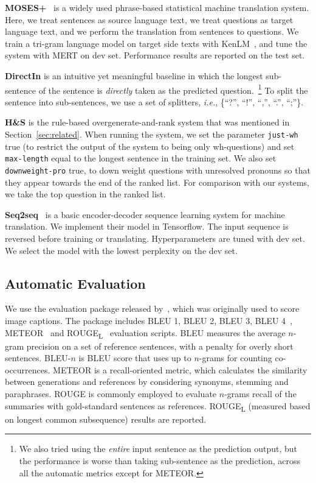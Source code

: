 \documentclass[11pt,a4paper]{article}
\newcommand{\ie}{{\em i.e.}}
\begin{document}
\vspace{0.1cm} \noindent \textbf{MOSES+}~\cite{koehn2007moses} is a widely used phrase-based statistical machine translation system. Here, we treat sentences as source language text, we treat questions as target language text, and we perform the translation from sentences to questions. We train a tri-gram language model on target side texts with KenLM~\cite{KenLM2015}, and tune the system with MERT on dev set. Performance results are reported on the test set.


\vspace{0.1cm} \noindent \textbf{DirectIn} is an intuitive yet meaningful baseline in which the longest sub-sentence of the sentence is \emph{directly} taken as the predicted question.~\footnote{We also tried using the \emph{entire} input sentence as the prediction output, but the performance is worse than taking sub-sentence as the prediction, across all the automatic metrics except for METEOR.} To split the sentence into sub-sentences, we use a set of splitters, \ie, \{``?'', ``!'', ``,'', ``.'', ``;''\}.

\vspace{0.1cm} \noindent \textbf{H\&S} is the rule-based overgenerate-and-rank system that was mentioned in Section~\ref{sec:related}. When running the system, we set the parameter \verb|just-wh| true (to restrict the output of the system to being only wh-questions) and set \verb|max-length| equal to the longest sentence in the training set. We also set \verb|downweight-pro| true, to down weight questions with unresolved pronouns so that they appear towards the end of the ranked list. For comparison with our systems, we take the top question in the ranked list.

\vspace{0.1cm} \noindent \textbf{Seq2seq}~\cite{sutskever2014sequence} is a basic encoder-decoder sequence learning system for machine translation. We implement their model in Tensorflow. The input sequence is reversed before training or translating. Hyperparameters are tuned with dev set. We select the model with the lowest perplexity on the dev set.


\subsection{Automatic Evaluation} 

We use the evaluation package released by~, which was originally used to score image captions. The package includes BLEU 1, BLEU 2, BLEU 3, BLEU 4~\cite{papineni2002bleu}, METEOR~\cite{2014meteor} and ROUGE\textsubscript{L}~\cite{lin2004rouge} evaluation scripts. BLEU measures the average $n$-gram precision on a set of reference sentences, with a penalty for overly short sentences. BLEU-$n$ is BLEU score that uses up to $n$-grams for counting co-occurrences. METEOR is a recall-oriented metric, which calculates the similarity between generations and references by considering synonyms, stemming and paraphrases. ROUGE is commonly employed to evaluate $n$-grams recall of the summaries with gold-standard sentences as references. ROUGE\textsubscript{L} (measured based on longest common subsequence) results are reported.
  
\end{document}
